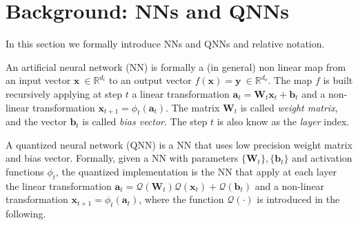 \section{Background: NNs and QNNs}\label{sec:background}

In this section we formally introduce NNs and QNNs and relative notation.

An artificial neural network (NN) is formally a (in general) non linear map from an input vector $\mathbf{x} \ \in \mathbb{R}^{d_i}$ to an output vector $f(\mathbf{x} ) = \mathbf{y} \ \in \mathbb{R}^{d_o}$. The map $f$ is built recursively applying at step $t$ a linear transformation $ \mathbf{a}_t = \mathbf{W}_t\mathbf{x}_t + \mathbf{b}_t$ and a non-linear transformation $\mathbf{x}_{t+1} = \phi_t(\mathbf{a}_t)$. The matrix $\mathbf{W}_t$ is called \emph{weight matrix}, and the vector $\mathbf{b}_t$ is called \emph{bias vector}. The step $t$ is also know as the \emph{layer} index. 

A quantized neural network (QNN) is a NN that uses low precision weight matrix and bias vector. Formally, given a NN with parameters $\{\mathbf{W}_t\}, \{\mathbf{b}_t\}$ and activation functions $\phi_t$, the quantized implementation is the NN that apply at each layer the linear transformation $\mathbf{a}_t = \mathcal{Q}(\mathbf{W}_t) \mathcal{Q}(\mathbf{x}_t) + \mathcal{Q}(\mathbf{b}_t)$ and a non-linear transformation $\mathbf{x}_{t+1} = \phi_t(\mathbf{a}_t)$, where the function $\mathcal{Q}(\cdot)$ is introduced in the following.

